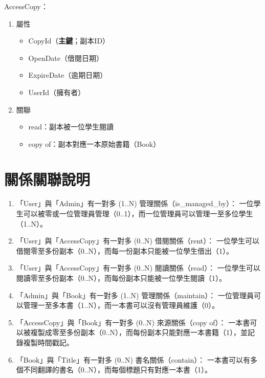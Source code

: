 \hspace*{-2em}AccessCopy：

\begin{enumerate}
\item 屬性
    \begin{itemize}
    \item CopyId（\textbf{主鍵}；副本ID）
    \item OpenDate（借閱日期）
    \item ExpireDate（逾期日期）
    \item UserId（擁有者）
    \end{itemize}
\item 關聯
    \begin{itemize}
    \item read：副本被一位學生閱讀
    \item copy of：副本對應一本原始書籍（Book）
    \end{itemize}
\end{enumerate}
  


\section{關係關聯說明}

\begin{enumerate}
    \item 「User」與「Admin」有一對多 (1..N) 管理關係（is\_managed\_by）：  
      一位學生可以被零或一位管理員管理（0..1），而一位管理員可以管理一至多位學生（1..N）。
    \item 「User」與「AccessCopy」有一對多 (0..N) 借閱關係（rent）：  
      一位學生可以借閱零至多份副本（0..N），而每一份副本只能被一位學生借出（1）。
    \item 「User」與「AccessCopy」有一對多 (0..N) 閱讀關係（read）：  
      一位學生可以閱讀零至多份副本（0..N），而每份副本只能被一位學生閱讀（1）。
    \item 「Admin」與「Book」有一對多 (1..N) 管理關係（maintain）：  
      一位管理員可以管理一至多本書（1..N），而一本書可以沒有管理員維護（0）。
    \item 「AccessCopy」與「Book」有一對多 (0..N) 來源關係（copy of）：  
      一本書可以被複製成零至多份副本（0..N），而每份副本只能對應一本書籍（1），並記錄複製時間戳記。
    \item 「Book」與「Title」有一對多 (0..N) 書名關係（contain）：  
      一本書可以有多個不同翻譯的書名（0..N），而每個標題只有對應一本書（1）。
  \end{enumerate}
  